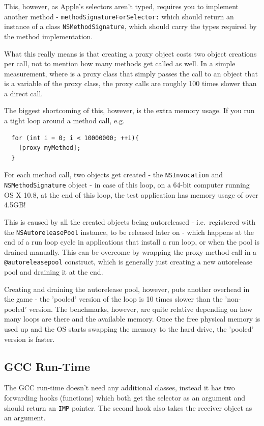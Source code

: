 This, however, as Apple's selectors aren't typed, requires you to implement another method - \verb=methodSignatureForSelector:= which should return an instance of a class \verb=NSMethodSignature=, which should carry the types required by the method implementation.

What this really means is that creating a proxy object costs two object creations per call, not to mention how many methods get called as well. In a simple measurement, where is a proxy class that simply passes the call to an object that is a variable of the proxy class, the proxy calls are roughly 100 times slower than a direct call.

The biggest shortcoming of this, however, is the extra memory usage. If you run a tight loop around a method call, e.g.

\begin{verbatim}
  for (int i = 0; i < 10000000; ++i){
    [proxy myMethod];
  }
\end{verbatim}

For each method call, two objects get created - the \verb=NSInvocation= \newline{}and \verb=NSMethodSignature= object - in case of this loop, on a 64-bit computer running OS X 10.8, at the end of this loop, the test application has memory usage of over 4.5GB!

This is caused by all the created objects being autoreleased - i.e.\ registered with the \verb=NSAutoreleasePool= instance, to be released later on - which happens at the end of a run loop cycle in applications that install a run loop, or when the pool is drained manually. This can be overcome by wrapping the proxy method call in a \verb=@autoreleasepool= construct, which is generally just creating a new autorelease pool and draining it at the end.

Creating and draining the autorelease pool, however, puts another overhead in the game - the 'pooled' version of the loop is 10 times slower than the 'non-pooled' version. The benchmarks, however, are quite relative depending on how many loops are there and the available memory. Once the free physical memory is used up and the OS starts swapping the memory to the hard drive, the 'pooled' version is faster.

\subsection{GCC Run-Time}

The GCC run-time doesn't need any additional classes, instead it has two forwarding hooks (functions) which both get the selector as an argument and should return an \verb=IMP= pointer. The second hook also takes the receiver object as an argument.

